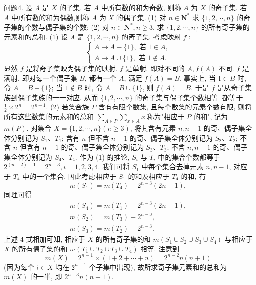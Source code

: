 问题4. 设 $A$ 是 $X$ 的子集.
若 $A$ 中所有数的和为奇数, 则称 $A$ 为 $X$ 的奇子集.
若 $A$ 中所有数的和为偶数,则称 $A$ 为 $X$ 的偶子集.
(1) 对 $n \in \mathbf{N}^*$ 求 $\{1,2, \cdots, n\}$ 的奇子集的个数与偶子集的个数;
(2) 对 $n \in \mathbf{N}^*, n \geqslant 3$, 求 $\{1,2, \cdots, n\}$ 的所有奇子集的元素和的总和.
(1) 设 $A$ 是 $\{1,2, \cdots, n\}$ 的奇子集.
考虑映射 $f$ :
$$
\left\{\begin{array}{l}
A \mapsto A-\{1\}, \text { 若 } 1 \in A, \\
A \mapsto A \cup\{1\}, \text { 若 } 1 \notin A .
\end{array}\right.
$$
显然 $f$ 是将奇子集映为偶子集的映射.
$f$ 是单射, 即对不同的 $A, f(A)$ 不同.
$f$ 是满射, 即对每一个偶子集 $B$, 都有一个 $A$, 满足 $f(A)=B$. 事实上, 当 $1 \in B$ 时, 令 $A=B-\{1\}$; 当 $1 \notin B$ 时, 令 $A=B \cup\{1\}$, 则 $f(A)=B$.
于是 $f$ 是从奇子集族到偶子集族的一一对应.
从而 $\{1,2, \cdots, n\}$ 的奇子集与偶子集个数相等, 都等于 $\frac{1}{2} \times 2^n=2^{n-1}$.
(2) 若集合族 $P$ 含有有限个数集, 且每个数集的元素个数有限, 则将所有这些数集的元素和的总和 $\sum_{A \in P} \sum_{x \in A} x$ 称为"相应于 $P$ 的和", 记为 $m(P)$.
对集合 $X=\{1,2, \cdots, n\}(n \geqslant 3)$, 将其含有元素 $n, n-1$ 的奇、偶子集全体分别记为 $S_1 、 T_1$; 含有 $n$ 但不含 $n-1$ 的奇、偶子集全体分别记为 $S_2 、 T_2$; 不含 $n$ 但含有 $n-1$ 的奇、偶子集全体分别记为 $S_3 、 T_3$; 不含 $n, n-1$ 的奇、偶子集全体分别记为 $S_4 、 T_4$. 作为 (1) 的推论, $S_i$ 与 $T_i$ 中的集合个数都等于 $2^{(n-2)-1}=2^{n-3}, i=1,2,3,4$.
我们可将 $S_1$ 中每个集合去掉元素 $n, n-1$, 对应于 $T_4$ 中的一个集合, 因此考虑相应于 $S_1$ 的和及相应于 $T_4$ 的和, 有
$$
m\left(S_1\right)=m\left(T_4\right)+2^{n-3}(2 n-1),
$$
同理可得
$$
\begin{gathered}
m\left(S_4\right)=m\left(T_1\right)-2^{n-3}(2 n-1), \\
m\left(S_2\right)=m\left(T_3\right)+2^{n-3}, \\
m\left(S_3\right)=m\left(T_2\right)-2^{n-3} .
\end{gathered}
$$
上述 4 式相加可知, 相应于 $X$ 的所有奇子集的和 $m\left(S_1 \cup S_2 \cup S_3 \cup S_4\right)$ 与相应于 $X$ 的所有偶子集的和 $m\left(T_1 \cup T_2 \cup T_3 \cup T_4\right)$ 相等.
注意到
$$
m(X)=2^{n-1} \times(1+2+\cdots+n)=2^{n-2} n(n+1)
$$
(因为每个 $i \in X$ 均在 $2^{n-1}$ 个子集中出现), 故所求奇子集元素和的总和为 $m(X)$ 的一半, 即 $2^{n-3} n(n+1)$.




